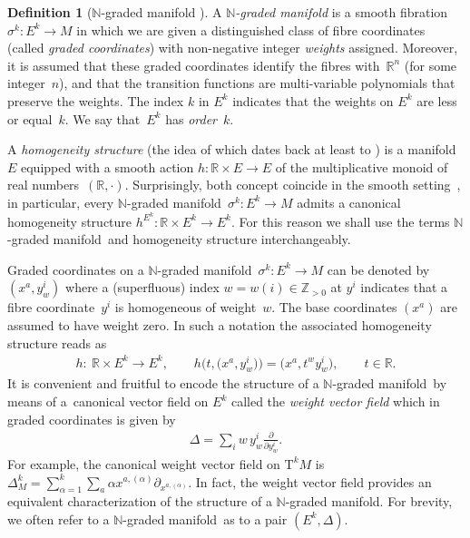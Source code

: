 \documentclass[10pt,a4paper]{amsart}
\newcommand{\grB}{{$\N$-graded manifold}}
\newcommand{\degree}{{order}}
\newcommand{\R}{\mathbb{R}}
\newcommand{\Z}{\mathbb{Z}}
\newcommand{\N}{\mathbb{N}}
\newcommand{\pa}{\partial}
\newcommand{\ra}{\rightarrow}
\newcommand{\TT}[1]{\mathrm{T}^{#1}} %
\numberwithin{equation}{section}
\theoremstyle{definition}
\newtheorem{df}[thm]{Definition}
\begin{document}
\begin{df}[$\N$-graded manifold \cite{Voronov_2002}]\label{def:gr_bund}
 A \emph{$\N$-graded manifold} is a smooth fibration \mbox{$\sigma^k\colon\! E^k{\ra} M$} in which we are given a distinguished class of fibre coordinates (called \emph{graded coordinates}) with non-negative integer \emph{weights} assigned. Moreover, it is assumed that these graded coordinates identify the fibres with~$\R^n$ (for some integer~$n$), and that the transition functions are multi-variable polynomials that preserve the weights. The index $k$ in $E^k$ indicates that the weights on $E^k$ are less or equal~$k$. We say that~$E^k$ has \emph{\degree}~$k$.

A \emph{homogeneity structure} (the idea of which dates back at least to \cite{Severa_2005}) is a manifold~$E$ equipped with a smooth action $h\colon \R\times E\ra E$ of the multiplicative monoid of real num\-bers~$(\R, \cdot)$. Surprisingly, both concept coincide in the smooth setting~\cite[Theorem~4.2]{JG_MR_gr_bund_hgm_str_2011}, in particular, every \grB\ $\sigma^k\colon E^k\ra M$ admits a canonical homogeneity structure \mbox{$h^{E^k}\colon \R\times E^k\ra E^k$}. For this reason we shall use the terms \grB\ and homogeneity structure interchangeably.
\end{df}

Graded coordinates on a \grB\ $\sigma^k\colon E^k \ra M$ can be denoted by $(x^a, y^i_w)$ where a (superfluous) index $w=w(i)\in \Z_{>0}$ at $y^i$ indicates that a fibre coordinate~$y^i$ is homogeneous of weight~$w$. The base coordinates $(x^a)$ are assumed to have weight zero. In such a notation the associated homogeneity structure reads as
\begin{gather*}
h\colon \ \R \times E^k \ra E^k, \qquad h\big(t, \big(x^a, y^i_w\big)\big) = \big( x^a, t^w y^i_w\big), \qquad t\in \R.
\end{gather*}
It is convenient and fruitful to encode the structure of a \grB\ by means of a~canonical vector field on $E^k$ called the \emph{weight vector field} which in graded coordinates is given by
\begin{gather*}
 \Delta = \sum_i w\, y^i_w \frac{\pa}{\pa y^i_w}.
\end{gather*}
 For example, the canonical weight vector field on $\TT{k} M$ is
$ \Delta_M^k = \sum_{\alpha = 1}^k \sum_a \alpha x^{a, (\alpha)} \pa_{x^{a, (\alpha)}}$. In fact, the weight vector field provides an equivalent characterization of the structure of a \grB. For brevity, we often refer to a \grB\ as to a pair $(E^k, \Delta)$.
\end{document}

